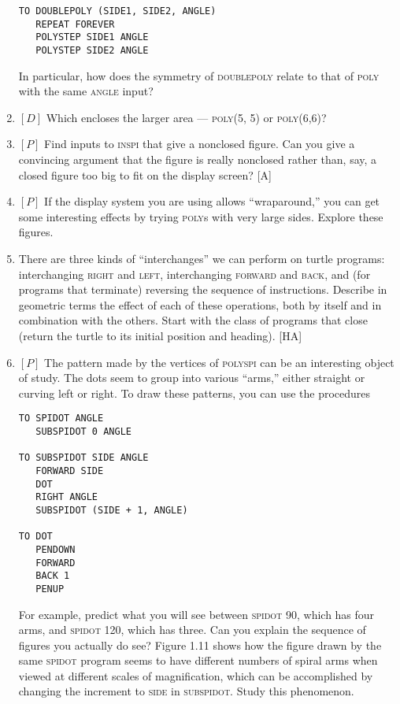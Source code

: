 \documentclass{book}
\begin{document}
\begin{enumerate}
\begin{verbatim}
TO DOUBLEPOLY (SIDE1, SIDE2, ANGLE)
   REPEAT FOREVER
   POLYSTEP SIDE1 ANGLE
   POLYSTEP SIDE2 ANGLE
\end{verbatim}
In particular, how does the symmetry of \textsc{doublepoly} relate to that of
\textsc{poly} with the same \textsc{angle} input?  
\item $[D]$ Which encloses the larger area --- \textsc{poly(5, 5)} or \textsc{poly(6,6)}?
\item $[P]$ Find inputs to \textsc{inspi} that give a nonclosed figure. Can you give
a convincing argument that the figure is really nonclosed rather than,
say, a closed figure too big to fit on the display screen? [A]
\item $[P]$ If the display system you are using allows ``wraparound,'' you
can get some interesting effects by trying \textsc{poly}s with very large sides.
Explore these figures.  
\item There are three kinds of ``interchanges'' we can perform on turtle
programs: interchanging \textsc{right} and \textsc{left}, interchanging \textsc{forward} and
\textsc{back}, and (for programs that terminate) reversing the sequence of instructions. Describe in geometric terms the effect of each of these operations, both by itself and in combination with the others. Start with the
class of programs that close (return the turtle to its initial position and
heading). [HA]
\item $[P]$ The pattern made by the vertices of \textsc{polyspi} can be an interesting object of study. The dots seem to group into various ``arms,'' either
straight or curving left or right. To draw these patterns, you can use
the procedures

\begin{verbatim}
TO SPIDOT ANGLE
   SUBSPIDOT 0 ANGLE

TO SUBSPIDOT SIDE ANGLE
   FORWARD SIDE
   DOT
   RIGHT ANGLE
   SUBSPIDOT (SIDE + 1, ANGLE)

TO DOT
   PENDOWN
   FORWARD
   BACK 1
   PENUP
\end{verbatim}
For example, predict what you will see between \textsc{spidot 90}, which has
four arms, and \textsc{spidot 120}, which has three. Can you explain the
sequence of figures you actually do see? Figure 1.11 shows how the figure
drawn by the same \textsc{spidot} program seems to have different numbers
of spiral arms when viewed at different scales of magnification, which
can be accomplished by changing the increment to \textsc{side} in \textsc{subspidot}.
Study this phenomenon.  


\end{enumerate}
\end{document}
